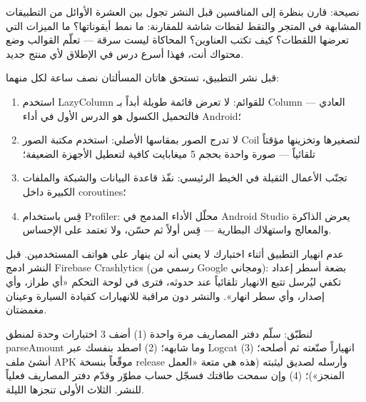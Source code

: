 \begin{tcbinfo}{نصيحة: قارن بنظرة إلى المنافسين}
قبل النشر تجول بين العشرة الأوائل من التطبيقات المشابهة في المتجر والتقط لقطات شاشة للمقارنة: ما نمط أيقوناتها؟ ما الميزات التي تعرضها اللقطات؟ كيف تكتب العناوين؟ المحاكاة ليست سرقة — تعلّم القوالب وضع محتواك أنت، فهذا أسرع درس في الإطلاق لأي منتج جديد.

\end{tcbinfo}


قبل نشر التطبيق، تستحق هاتان المسألتان نصف ساعة لكل منهما:


\begin{enumerate}
  \item استخدم LazyColumn للقوائم: لا تعرض قائمة طويلة أبداً بـ Column العادي — فالتحميل الكسول هو الدرس الأول في أداء Android؛
  \item لا تدرج الصور بمقاسها الأصلي: استخدم مكتبة الصور Coil لتصغيرها وتخزينها مؤقتاً تلقائياً — صورة واحدة بحجم 5 ميغابايت كافية لتعطيل الأجهزة الضعيفة؛
  \item تجنّب الأعمال الثقيلة في الخيط الرئيسي: نفّذ قاعدة البيانات والشبكة والملفات الكبيرة داخل coroutines؛
  \item قِس باستخدام Profiler: محلّل الأداء المدمج في Android Studio يعرض الذاكرة والمعالج واستهلاك البطارية — قِس أولاً ثم حسّن، ولا تعتمد على الإحساس.
\end{enumerate}


عدم انهيار التطبيق أثناء اختبارك لا يعني أنه لن ينهار على هواتف المستخدمين. قبل النشر ادمج Firebase Crashlytics (رسمي من Google ومجاني): بضعة أسطر إعداد تكفي ليُرسل تتبع الانهيار تلقائياً عند حدوثه، فترى في لوحة التحكم «أي طراز، وأي إصدار، وأي سطر انهار». والنشر دون مراقبة للانهيارات كقيادة السيارة وعينان مغمضتان.

\begin{tcbpractice}{لنطبّق: سلّم دفتر المصاريف مرة واحدة}
(1) أضف 3 اختبارات وحدة لمنطق parseAmount وما شابهه؛ (2) اصطد بنفسك عبر Logcat انهياراً صنّعته ثم أصلحه؛ (3) أنشئ ملف APK موقّعاً بنسخة release وأرسله لصديق ليثبته (هذه هي متعة «العمل المنجز»)؛ (4) وإن سمحت طاقتك فسجّل حساب مطوّر وقدّم دفتر المصاريف فعلياً للنشر. الثلاث الأولى تنجزها الليلة.

\end{tcbpractice}

